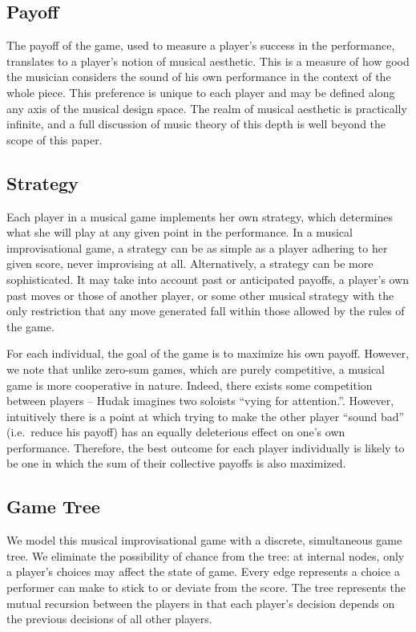 \documentclass{article}
\begin{document}
\subsection{Payoff}
The payoff of the game, used to measure a player's success in the
performance, translates to a player's notion of musical aesthetic. This
is a measure of how good the musician considers the sound of his own
performance in the context of the whole piece. This preference is
unique to each player and may be defined along any axis of the musical
design space. The realm of musical aesthetic is practically infinite,
and a full discussion of music theory of this depth is well beyond the
scope of this paper.

\subsection{Strategy}
Each player in a musical game implements her own strategy, which
determines what she will play at any given point in the performance. In
a musical improvisational game, a strategy can be as simple as a player
adhering to her given score, never improvising at all.
Alternatively, a strategy can be more sophisticated.  It may take into account
past or anticipated payoffs, a player's own past moves or those of
another player, or some other musical strategy with the only restriction
that any move generated fall within those allowed by the
rules of the game.

For each individual, the goal of the game is to maximize his own
payoff. However, we note that unlike zero-sum games, which are purely
competitive, a musical game is more cooperative in nature. Indeed, there
exists some competition between players -- Hudak imagines two soloists
``vying for attention.''. However, intuitively there is a point at which
trying to make the other player ``sound bad'' (i.e.~reduce his payoff)
has an equally deleterious effect on one's own performance. Therefore,
the best outcome for each player individually is likely to be one in
which the sum of their collective payoffs is also maximized.

\subsection{Game Tree}
We model this musical improvisational game with a discrete, simultaneous
game tree. We eliminate the possibility of chance from the tree: at
internal nodes, only a player's choices may affect the state of game.
Every edge represents a choice a performer can make to stick to or
deviate from the score. The tree represents the mutual recursion between
the players in that each player's decision depends on the previous
decisions of all other players.
\end{document}
